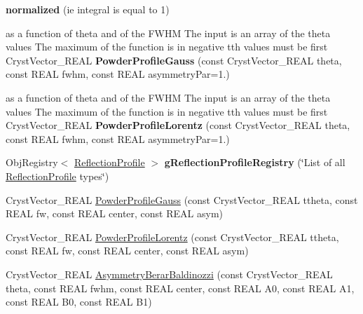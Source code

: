 \begin{DoxyCompactItemize}
\item 
\mbox{\label{namespace_obj_cryst_a8c1d9dbba7310068833d76e2a0ac28f3}} 
{\bfseries normalized} (ie integral is equal to 1)
\item 
\mbox{\label{namespace_obj_cryst_af8035fe03c26781dfe3c0bb0a474c403}} 
as a function of theta and of the F\+W\+HM The input is an array of the theta values The maximum of the function is in negative tth values must be first Cryst\+Vector\+\_\+\+R\+E\+AL {\bfseries Powder\+Profile\+Gauss} (const Cryst\+Vector\+\_\+\+R\+E\+AL theta, const R\+E\+AL fwhm, const R\+E\+AL asymmetry\+Par=1.)
\item 
\mbox{\label{namespace_obj_cryst_aa3b7d7ca2293da99faa786725a983b88}} 
as a function of theta and of the F\+W\+HM The input is an array of the theta values The maximum of the function is in negative tth values must be first Cryst\+Vector\+\_\+\+R\+E\+AL {\bfseries Powder\+Profile\+Lorentz} (const Cryst\+Vector\+\_\+\+R\+E\+AL theta, const R\+E\+AL fwhm, const R\+E\+AL asymmetry\+Par=1.)
\item 
\mbox{\label{namespace_obj_cryst_a0ce7a64bdf74f506cb6848e3ec024383}} 
Obj\+Registry$<$ \mbox{\hyperlink{class_obj_cryst_1_1_reflection_profile}{Reflection\+Profile}} $>$ {\bfseries g\+Reflection\+Profile\+Registry} (\char`\"{}List of all \mbox{\hyperlink{class_obj_cryst_1_1_reflection_profile}{Reflection\+Profile}} types\char`\"{})
\item 
Cryst\+Vector\+\_\+\+R\+E\+AL \mbox{\hyperlink{namespace_obj_cryst_a0e958fc90a47363fe0293f25b500c3ab}{Powder\+Profile\+Gauss}} (const Cryst\+Vector\+\_\+\+R\+E\+AL ttheta, const R\+E\+AL fw, const R\+E\+AL center, const R\+E\+AL asym)
\item 
Cryst\+Vector\+\_\+\+R\+E\+AL \mbox{\hyperlink{namespace_obj_cryst_a1fa89883fa49bb02665e4e9d1c85495b}{Powder\+Profile\+Lorentz}} (const Cryst\+Vector\+\_\+\+R\+E\+AL ttheta, const R\+E\+AL fw, const R\+E\+AL center, const R\+E\+AL asym)
\item 
\mbox{\label{namespace_obj_cryst_aba8471b6bd60a1f8762e11ce13f030dc}} 
Cryst\+Vector\+\_\+\+R\+E\+AL \mbox{\hyperlink{namespace_obj_cryst_aba8471b6bd60a1f8762e11ce13f030dc}{Asymmetry\+Berar\+Baldinozzi}} (const Cryst\+Vector\+\_\+\+R\+E\+AL theta, const R\+E\+AL fwhm, const R\+E\+AL center, const R\+E\+AL A0, const R\+E\+AL A1, const R\+E\+AL B0, const R\+E\+AL B1)

\end{DoxyCompactItemize}
